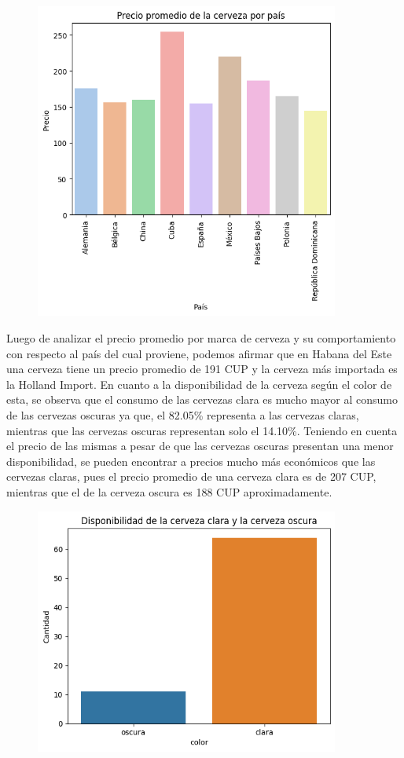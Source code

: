 \documentclass[a4paper,12pt]{article}
\begin{document}
		\begin{figure}[h]
			\centering
			\includegraphics[width=10cm]{price country.png}
			\label{fig:relacion precio-país de la cerveza}
		\end{figure}
		
		Luego de analizar el precio promedio por marca de cerveza y su comportamiento con respecto al país del cual proviene, podemos afirmar que en Habana del Este una cerveza tiene un precio promedio de 191 CUP y la cerveza más importada es la Holland Import. En cuanto a la disponibilidad de la cerveza según el color de esta, se observa que el consumo de las cervezas clara es mucho mayor al consumo de las cervezas oscuras ya que, el 82.05\% representa a las cervezas claras, mientras que las cervezas oscuras representan solo el 14.10\%. Teniendo en cuenta el precio de las mismas a pesar de que las cervezas oscuras presentan una menor disponibilidad, se pueden encontrar a precios mucho más económicos que las cervezas claras, pues el precio promedio de una cerveza clara es de 207 CUP, mientras que el de la cerveza oscura es 188 CUP aproximadamente.
		
		\begin{figure}[h]
			\centering
			\includegraphics[width=10cm]{dark and light.png}
			\label{fig:cerveza según su color}
		\end{figure}
		
\end{document}

